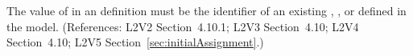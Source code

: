 The value of  in an \InitialAssignment definition must be the
identifier of an existing \Compartment, \Species, or \Parameter defined in
the model.  (References: L2V2 Section~4.10.1; L2V3
Section~4.10; L2V4 Section~4.10; L2V5 Section~\ref{sec:initialAssignment}.)
